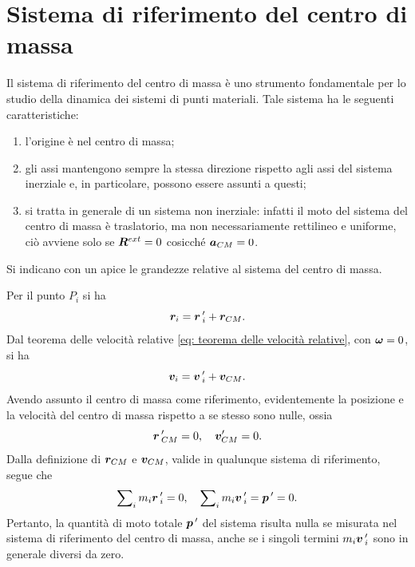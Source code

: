 \section{Sistema di riferimento del centro di massa}
Il sistema di riferimento del centro di massa è uno strumento fondamentale per lo studio della dinamica dei sistemi di punti materiali. Tale sistema ha le seguenti caratteristiche:
\begin{enumerate}
    \item l'origine è nel centro di massa;
    \item gli assi mantengono sempre la stessa direzione rispetto agli assi del sistema inerziale e, in particolare, possono essere assunti a questi;
    \item si tratta in generale di un sistema non inerziale: infatti il moto del sistema del centro di massa è traslatorio, ma non necessariamente rettilineo e uniforme, ciò avviene solo se $\bm{R}^{ext}=0$ cosicché $\bm{a}_{CM}=0$.
\end{enumerate}
\begin{notz}
    Si indicano con un apice le grandezze relative al sistema del centro di massa.
\end{notz}
Per il punto $P_i$ si ha
\begin{equation}
    \bm{r}_i=\bm{r}\,'_i+\bm{r}_{CM}.
\end{equation}
Dal teorema delle velocità relative \eqref{eq: teorema delle velocità relative}, con $\bm{\omega}=0$, si ha
\begin{equation}
    \bm{v}_i=\bm{v}\,'_i+\bm{v}_{CM}.
\end{equation}
Avendo assunto il centro di massa come riferimento, evidentemente la posizione e la velocità del centro di massa rispetto a se stesso sono nulle, ossia
\begin{equation}
    \bm{r}\,'_{CM}=0,\quad\bm{v}_{CM}'=0.
\end{equation}
Dalla definizione di $\bm{r}_{CM}$ e $\bm{v}_{CM}$, valide in qualunque sistema di riferimento, segue che
\begin{equation}
    \sum\nolimits_im_i\bm{r}\,'_i=0,\quad\sum\nolimits_im_i\bm{v}\,'_i=\bm{p}\,'=0.
\end{equation}
Pertanto, la quantità di moto totale $\bm{p}\,'$ del sistema risulta nulla se misurata nel sistema di riferimento del centro di massa, anche se i singoli termini $m_i\bm{v}\,'_i$ sono in generale diversi da zero. 

